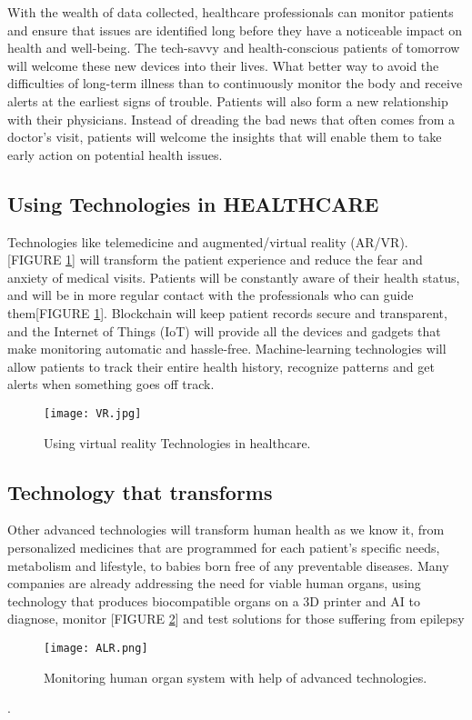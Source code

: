 \documentclass[12pt]{article}
\begin{document}
\> With the wealth of data collected, healthcare professionals can monitor patients and ensure that issues are identified long before they have a noticeable impact on health and well-being.
The tech-savvy and health-conscious patients of tomorrow will welcome these new devices into their lives.
What better way to avoid the difficulties of long-term illness than to continuously monitor the body and receive alerts at the earliest signs of trouble. Patients will also form a new relationship with their physicians.
Instead of dreading the bad news that often comes from a doctor's visit, patients will welcome the insights that will enable them to take early action on potential health issues.\\
 
\clearpage
\subsection{Using Technologies in HEALTHCARE} Technologies like telemedicine and augmented/virtual reality 
(AR/VR).
 [FIGURE \ref{fig_VR}] will transform the patient experience and reduce the 
fear and anxiety of medical visits. Patients will be constantly 
aware of their health status, and will be in more regular contact 
with the professionals who can guide them[FIGURE \ref{fig_VR}]. Blockchain will keep 
patient records secure and transparent, and the Internet of 
Things (IoT) will provide all the devices and gadgets that make 
monitoring automatic and hassle-free. 
Machine-learning technologies will allow patients to track their 
entire health history, recognize patterns and get alerts when 
something goes off track.
\begin{figure}[h]
\centering
\texttt{[image: VR.jpg]}
\caption{Using virtual reality  Technologies in healthcare.}
\label{fig_VR}
\end{figure}

\subsection{Technology that transforms}
Other advanced technologies will transform human health as we know it, from personalized medicines that are programmed for each patient's specific needs, metabolism and lifestyle, to babies born free of any preventable diseases.
Many companies are already addressing the need for viable human organs, using technology that produces biocompatible organs on a 3D printer and  AI to diagnose, monitor [FIGURE \ref{fig_ALR}] and test solutions for those suffering from epilepsy
 \begin{figure}[h]
\centering
\texttt{[image: ALR.png]}
\caption{Monitoring  human organ system with help of advanced technologies.}
\label{fig_ALR}
\end{figure}
.\\
\end{document}
